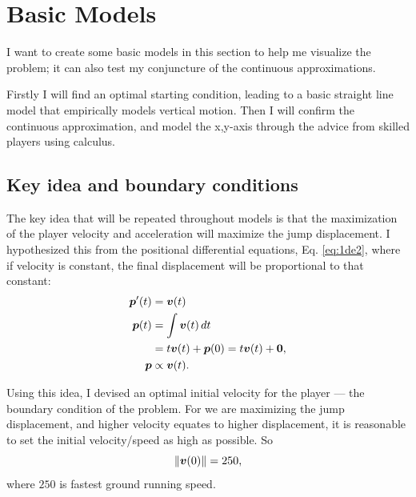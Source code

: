 
\section{Basic Models}
I want to create some basic models in this section to help me visualize the problem; it can also test my conjuncture of the continuous approximations.

Firstly I will find an optimal starting condition, leading to a basic straight line model that empirically models vertical motion. Then I will confirm the continuous approximation, and model the x,y-axis
through the advice from skilled players using calculus.

\subsection{Key idea and boundary conditions}
The key idea that will be repeated throughout models is that the maximization of the player velocity and acceleration will maximize the jump displacement. I hypothesized this from the positional differential equations, Eq. \ref{eq:1de2}, where if velocity is constant, the final displacement will be proportional to that constant:
\begin{align*}
    \boldsymbol{p}'(t) &= \boldsymbol{v}(t)\\
    \boldsymbol{p}(t) &= \int \boldsymbol{v}(t) \, dt\\
    &= t\boldsymbol{v}(t) + \boldsymbol{p}(0) = t\boldsymbol{v}(t) + \boldsymbol{0},\\
    \boldsymbol{p} &\propto \boldsymbol{v}(t).
\end{align*}

Using this idea, I devised an optimal initial velocity for the player --- the boundary condition of the problem. For we are maximizing the jump displacement, and higher velocity equates to higher displacement, it is reasonable to set the initial velocity/speed as high as possible. So
\[
    \|\boldsymbol{v}(0)\| = 250,
\]
where $250$ is fastest ground running speed.


